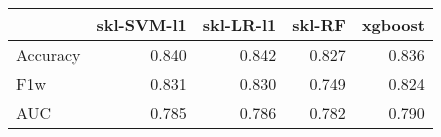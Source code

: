 \begin{tabular}{lrrrr}
\toprule
{} &  skl-SVM-l1 &  skl-LR-l1 &  skl-RF &  xgboost \\
\midrule
Accuracy &       0.840 &      0.842 &   0.827 &    0.836 \\
F1w      &       0.831 &      0.830 &   0.749 &    0.824 \\
AUC      &       0.785 &      0.786 &   0.782 &    0.790 \\
\bottomrule
\end{tabular}
